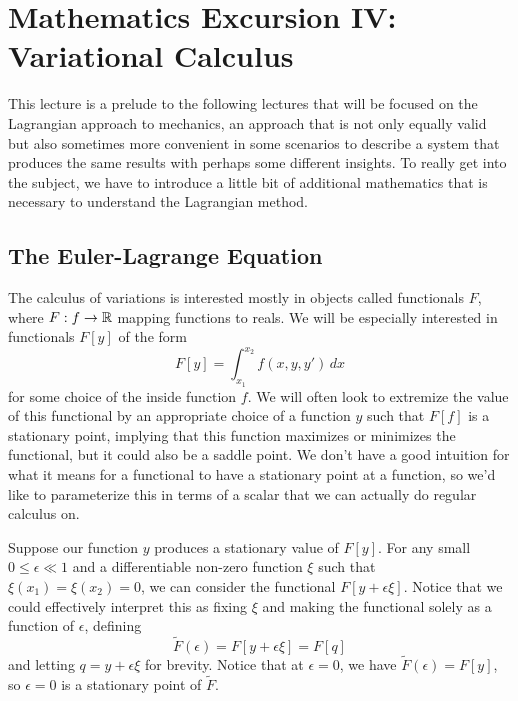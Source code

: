 \section{Mathematics Excursion IV: Variational Calculus}

This lecture is a prelude to the following lectures that will be focused on the Lagrangian approach to mechanics, an approach that is not only equally valid but also sometimes more convenient in some scenarios to describe a system that produces the same results with perhaps some different insights. To really get into the subject, we have to introduce a little bit of additional mathematics that is necessary to understand the Lagrangian method. 

\subsection{The Euler-Lagrange Equation}
The calculus of variations is interested mostly in objects called functionals $F$, where $F: f \rightarrow \mathbb R$ mapping functions to reals. We will be especially interested in functionals $F[y]$ of the form
\[
	F[y] = \int_{x_1}^{x_2} f(x, y, y') \, dx 
\]
for some choice of the inside function $f$. We will often look to extremize the value of this functional by an appropriate choice of a function $y$ such that $F[f]$ is a stationary point, implying that this function maximizes or minimizes the functional, but it could also be a saddle point. We don't have a good intuition for what it means for a functional to have a stationary point at a function, so we'd like to parameterize this in terms of a scalar that we can actually do regular calculus on. 

Suppose our function $y$ produces a stationary value of $F[y]$. For any small $0 \leq \epsilon \ll 1$ and a differentiable non-zero function $\xi$ such that $\xi(x_1) = \xi(x_2) = 0$, we can consider the functional $F[y + \epsilon \xi]$. Notice that we could effectively interpret this as fixing $\xi$ and making the functional solely as a function of $\epsilon$, defining 
\[
	\tilde{F}(\epsilon) = F[y + \epsilon \xi] = F[q]
\]
and letting $q = y + \epsilon \xi$ for brevity. Notice that at $\epsilon = 0$, we have $\tilde{F}(\epsilon) = F[y]$, so $\epsilon = 0$ is a stationary point of $\tilde{F}$.  


